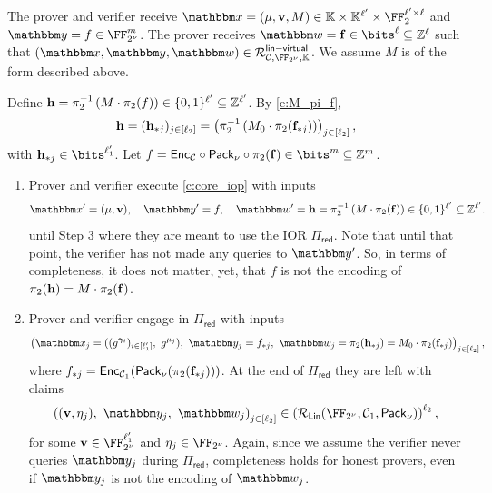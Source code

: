 \documentclass[11pt,letterpaper,usenames,dvipsnames]{article}
\begin{document}
\begin{construction}\label{c:virtual_iop}
The prover and verifier receive $\inp=(\mu, \vv,M)\in \evalfield \times \evalfield^{\codedim'} \times \FF_2^{\codedim'\times\codedim}$ and  $\oracle= f \in \comfield^\codelength$. The prover receives $\wit= \bff\in \bits^\codedim \subseteq \ZZ^\codedim$ such that $(\inp,\oracle, \wit) \in \Relation_{\cC, \comfield, \evalfield}^{\mathsf{lin-virtual}}$.  We assume $M$ is of the form described above.

 Define  $\mathbf{h} = \pi_2^{-1}\left(M\cdot \pi_2(f)\right) \in \{0,1\}^{\ell'} \subseteq \mathbb{Z}^{\ell'}$. By \eqref{e:M_pi_f}, $$\mathbf{h}=(\mathbf{h}_{*j})_{j\in [\ell_2]} = \left(\pi_2^{-1}\left( M_0\cdot \pi_2(\mathbf{f}_{*j}) \right)\right)_{j\in [\ell_2]},$$ with $ \bfh_{*j}\in \bits^{\codedim_1'}$. Let $f= \Enc_{\cC}\circ \pack\circ\pi_2(\bff)\in \bits^{\codelength} \subseteq \ZZ^{\codelength}$.
 \begin{enumerate}[leftmargin=*]
     \item Prover and verifier execute \cref{c:core_iop}  with inputs 
$$
\inp' = (\mu, \vv),  \quad \oracle'=f,\quad  \wit' = \bfh=\pi_2^{-1}\left(M\cdot \pi_2(\bff)\right) \in \{0,1\}^{\codedim'} \subseteq \ZZ^{\codedim'}.
$$
 until Step 3 where they are meant to use the IOR $\Pi_{\mathsf{red}}$. Note that until that point, the verifier has not made any queries to $\oracle'$. So, in terms of completeness, it does not matter, yet, that $f$ is not the encoding of $\pi_2(\mathbf{h})=M\cdot \pi_2(\mathbf{f})$.
 \item  Prover and verifier engage in $\Pi_{\mathsf{red}}$ with inputs
 $$\left(\inp_j=((g^{\bm{\gamma}_i})_{i \in [\codedim_1']},\ g^{\mu_j}),\  \oracle_j= f_{*j}, \ \wit_j=\picomfield(\bfh_{*j})=M_0\cdot \pi_2(\bff_{*j})\right)_{j\in [\codedim_2]},$$
 where $f_{*j}=\mathsf{Enc}_{\mathcal{C}_1}(\mathsf{Pack}_\nu(\pi_2(\mathbf{f}_{*j})))$. At the end of $\Pi_{\mathsf{red}}$ they are left with claims
%
\begin{equation}\label{e:virtual_IOPP_intermediate}
\left((\vv, \eta_j), \ \oracle_j, \ \wit_j\right)_{j\in [\codedim_2]} \in \left(\LIN( \comfield,\cC_1,\pack)\right)^{\codedim_2},
\end{equation}
%
for some $\vv\in \comfield^{ \codedim_1'}$ and $\eta_j \in \comfield$. Again, since we assume the verifier never queries $\oracle_j$ during $\Pi_{\mathsf{red}}$, completeness holds for honest provers, even if $\oracle_j$ is not the encoding of $\wit_j$.


\end{enumerate}
\end{construction}
\end{document}
